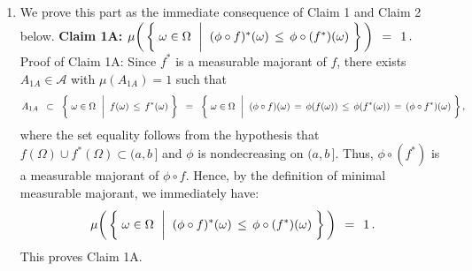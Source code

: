\begin{enumerate}
\item
	We prove this part as the immediate consequence of Claim 1 and Claim 2 below.
	\vskip 0.3cm
	\noindent
	\textbf{Claim 1A:}\quad
	$\mu\!\left(\,\left\{\;
		\omega \in \Omega
		\,\;\left\vert\;\;
		(\phi \circ f)^{*}(\omega) \,\overset{{\color{white}\vert}}{\leq}\, \phi \circ (f^{*})(\omega)
		\right.
	\,\right\}\,\right)
	\,\;=\;\, 1\,.$
	\vskip 0.2cm
	\noindent
	Proof of Claim 1A:\;\;
	Since $f^{*}$ is a measurable majorant of $f$,
	there exists $A_{1A} \in \mathcal{A}$ with $\mu(A_{1A}) = 1$ such that
	\begin{equation*}
	A_{1A}
	\;\;\subset\;\;
		\left\{\;
			\omega \in \Omega
			\,\;\left\vert\;\;
			f(\omega) \,\overset{{\color{white}\vert}}{\leq}\, f^{*}(\omega)
		\right.
		\,\right\}
	\;\; = \;\;
		\left\{\;
			\omega \in \Omega
			\,\;\left\vert\;\;
			(\phi \circ f)(\omega) \,=\, \phi(f(\omega)) \,\overset{{\color{white}\vert}}{\leq}\, \phi(f^{*}(\omega)) \,=\, (\phi \circ f^{*})(\omega)
		\right.
		\,\right\},
	\end{equation*}
	where the set equality follows from the hypothesis that $f(\Omega) \cup f^{*}(\Omega) \subset (a,b\,]$
	and $\phi$ is nondecreasing on $(a,b\,]$.
	Thus, $\phi \circ (f^{*})$ is a measurable majorant of $\phi \circ f$.
	Hence, by the definition of minimal measurable majorant, we immediately have:
	\begin{equation*}
	\mu\!\left(\,\left\{\;
		\omega \in \Omega
		\,\;\left\vert\;\;
		(\phi \circ f)^{*}(\omega) \,\overset{{\color{white}\vert}}{\leq}\, \phi \circ (f^{*})(\omega)
		\right.
	\,\right\}\,\right)
	\,\;=\;\, 1\,.
	\end{equation*}
	This proves Claim 1A.


\end{enumerate}
